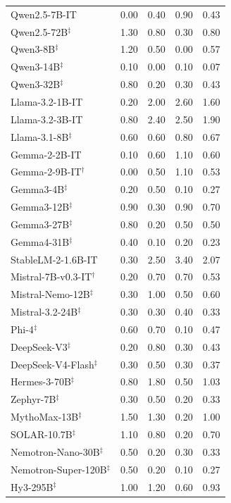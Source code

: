 \begin{table}[h]
\begin{tabular}{lcccc}
Qwen2.5-7B-IT & 0.00 & 0.40 & 0.90 & 0.43 \\
Qwen2.5-72B$^\ddagger$ & 1.30 & 0.80 & 0.30 & 0.80 \\
Qwen3-8B$^\ddagger$ & 1.20 & 0.50 & 0.00 & 0.57 \\
Qwen3-14B$^\ddagger$ & 0.10 & 0.00 & 0.10 & 0.07 \\
Qwen3-32B$^\ddagger$ & 0.80 & 0.20 & 0.30 & 0.43 \\
Llama-3.2-1B-IT & 0.20 & 2.00 & 2.60 & 1.60 \\
Llama-3.2-3B-IT & 0.80 & 2.40 & 2.50 & 1.90 \\
Llama-3.1-8B$^\ddagger$ & 0.60 & 0.60 & 0.80 & 0.67 \\
Gemma-2-2B-IT & 0.10 & 0.60 & 1.10 & 0.60 \\
Gemma-2-9B-IT$^\dagger$ & 0.00 & 0.50 & 1.10 & 0.53 \\
Gemma3-4B$^\ddagger$ & 0.20 & 0.50 & 0.10 & 0.27 \\
Gemma3-12B$^\ddagger$ & 0.90 & 0.30 & 0.90 & 0.70 \\
Gemma3-27B$^\ddagger$ & 0.80 & 0.20 & 0.50 & 0.50 \\
Gemma4-31B$^\ddagger$ & 0.40 & 0.10 & 0.20 & 0.23 \\
StableLM-2-1.6B-IT & 0.30 & 2.50 & 3.40 & 2.07 \\
Mistral-7B-v0.3-IT$^\dagger$ & 0.20 & 0.70 & 0.70 & 0.53 \\
Mistral-Nemo-12B$^\ddagger$ & 0.30 & 1.00 & 0.50 & 0.60 \\
Mistral-3.2-24B$^\ddagger$ & 0.30 & 0.30 & 0.40 & 0.33 \\
Phi-4$^\ddagger$ & 0.60 & 0.70 & 0.10 & 0.47 \\
DeepSeek-V3$^\ddagger$ & 0.20 & 0.80 & 0.30 & 0.43 \\
DeepSeek-V4-Flash$^\ddagger$ & 0.30 & 0.50 & 0.30 & 0.37 \\
Hermes-3-70B$^\ddagger$ & 0.80 & 1.80 & 0.50 & 1.03 \\
Zephyr-7B$^\ddagger$ & 0.30 & 0.50 & 0.20 & 0.33 \\
MythoMax-13B$^\ddagger$ & 1.50 & 1.30 & 0.20 & 1.00 \\
SOLAR-10.7B$^\ddagger$ & 1.10 & 0.80 & 0.20 & 0.70 \\
Nemotron-Nano-30B$^\ddagger$ & 0.50 & 0.20 & 0.30 & 0.33 \\
Nemotron-Super-120B$^\ddagger$ & 0.50 & 0.20 & 0.10 & 0.27 \\
Hy3-295B$^\ddagger$ & 1.00 & 1.20 & 0.60 & 0.93 \\

\end{tabular}
\end{table}
